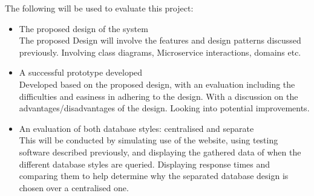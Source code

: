 The following will be used to evaluate this project:
\begin{itemize}
	\item The proposed design of the system\\
	The proposed Design will involve the features and design patterns discussed previously. Involving class diagrams, Microservice interactions, domains etc.
	\item A successful prototype developed\\
	Developed based on the proposed design, with an evaluation including the difficulties and easiness in adhering to the design. With a discussion on the advantages/disadvantages of the design. Looking into potential improvements.
	\item An evaluation of both database styles: centralised and separate\\
	This will be conducted by simulating use of the website, using testing software described previously, and displaying the gathered data of when the different database styles are queried. Displaying response times and comparing them to help determine why the separated database design is chosen over a centralised one.
\end{itemize}